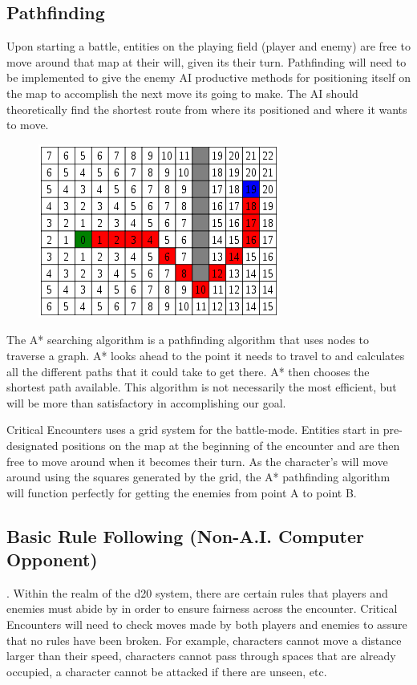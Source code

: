 \documentclass[12pt,a4paper]{report}
\begin{document}
		\subsection{Pathfinding}
			Upon starting a battle, entities on the playing field (player and enemy) are free to move around that map at their will, given its their turn. Pathfinding will need to be implemented to give the enemy AI productive methods for positioning itself on the map to accomplish the next move its going to make. The AI should theoretically find the shortest route from where its positioned and where it wants to move.
			\begin{figure}
				\includegraphics[scale=0.5]{aStar}
			\end{figure}
			The A* searching algorithm is a pathfinding algorithm that uses nodes to traverse a graph. A* looks ahead to the point it needs to travel to and calculates all the different paths that it could take to get there. A* then chooses the shortest path available. This algorithm is not necessarily the most efficient, but will be more than satisfactory in accomplishing our goal.
			
			Critical Encounters uses a grid system for the battle-mode. Entities start in pre-designated positions on the map at the beginning of the encounter and are then free to move around when it becomes their turn. As the character's will move around using the squares generated by the grid, the A* pathfinding algorithm will function perfectly for getting the enemies from point A to point B.
		\subsection{Basic Rule Following (Non-A.I. Computer Opponent)}.
			Within the realm of the d20 system, there are certain rules that players and enemies must abide by in order to ensure fairness across the encounter. Critical Encounters will need to check moves made by both players and enemies to assure that no rules have been broken. For example, characters cannot move a distance larger than their speed, characters cannot pass through spaces that are already occupied, a character cannot be attacked if there are unseen, etc. 
			
\end{document}

